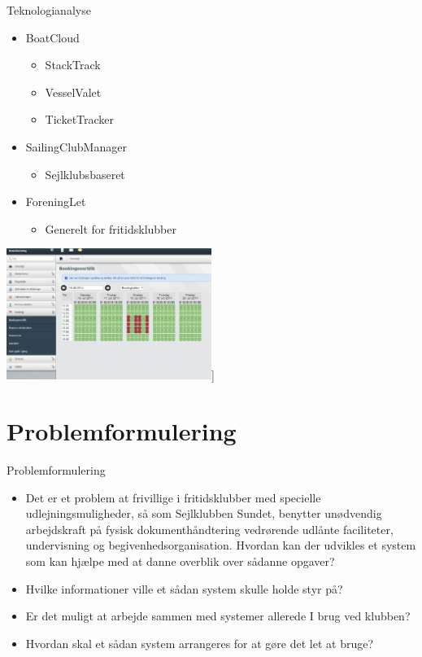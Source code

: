 \begin{frame}{Teknologianalyse}
  \begin{itemize}
    \item BoatCloud
    \begin{itemize}
      \item StackTrack
      \item VesselValet
      \item TicketTracker
    \end{itemize}
    \item SailingClubManager
    \begin{itemize}
      \item Sejlklubsbaseret
    \end{itemize}
    \item ForeningLet
    \begin{itemize}
      \item Generelt for fritidsklubber
    \end{itemize}
  \end{itemize}

  \begin{center}
        \includegraphics[width=0.5\textwidth]{images/ForeningLet.jpg}]
\end{center} 


  
\end{frame}


\section{Problemformulering}

\begin{frame}{Problemformulering}
  \begin{itemize}
    \item Det er et problem at frivillige i fritidsklubber med specielle udlejningsmuligheder, så som Sejlklubben Sundet, benytter unødvendig arbejdskraft på fysisk dokumenthåndtering vedrørende udlånte faciliteter, undervisning og begivenhedsorganisation. Hvordan kan der udvikles et system som kan hjælpe med at danne overblik over sådanne opgaver?
    \item Hvilke informationer ville et sådan system skulle holde styr på?
    \item Er det muligt at arbejde sammen med systemer allerede I brug ved klubben?
    \item Hvordan skal et sådan system arrangeres for at gøre det let at bruge?
  \end{itemize}
\end{frame}
